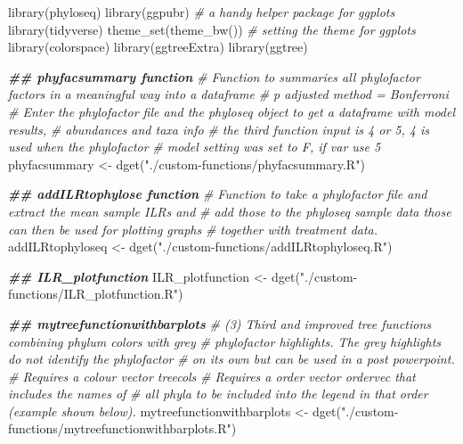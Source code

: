 \documentclass[
]{book}
\newenvironment{Shaded}{\begin{snugshade}}{\end{snugshade}}
\newcommand{\CommentTok}[1]{\textcolor[rgb]{0.56,0.35,0.01}{\textit{#1}}}
\newcommand{\DocumentationTok}[1]{\textcolor[rgb]{0.56,0.35,0.01}{\textbf{\textit{#1}}}}
\newcommand{\FunctionTok}[1]{\textcolor[rgb]{0.00,0.00,0.00}{#1}}
\newcommand{\NormalTok}[1]{#1}
\newcommand{\OtherTok}[1]{\textcolor[rgb]{0.56,0.35,0.01}{#1}}
\newcommand{\StringTok}[1]{\textcolor[rgb]{0.31,0.60,0.02}{#1}}
\begin{document}
\begin{Shaded}
\begin{Highlighting}[]
\FunctionTok{library}\NormalTok{(phyloseq)}
\FunctionTok{library}\NormalTok{(ggpubr)       }\CommentTok{\# a handy helper package for ggplots}
\FunctionTok{library}\NormalTok{(tidyverse)}
\FunctionTok{theme\_set}\NormalTok{(}\FunctionTok{theme\_bw}\NormalTok{())  }\CommentTok{\# setting the theme for ggplots}
\FunctionTok{library}\NormalTok{(colorspace)}
\FunctionTok{library}\NormalTok{(ggtreeExtra)}
\FunctionTok{library}\NormalTok{(ggtree)}
 
\DocumentationTok{\#\# phyfacsummary function }
\CommentTok{\# Function to summaries all phylofactor factors in a meaningful way into a dataframe}
\CommentTok{\# p adjusted method = Bonferroni}
\CommentTok{\# Enter the phylofactor file and the phyloseq object to get a dataframe with model results, }
\CommentTok{\# abundances and taxa info}
\CommentTok{\# the third function input is \textquotesingle{}4\textquotesingle{} or \textquotesingle{}5\textquotesingle{},  4 is used when the phylofactor }
\CommentTok{\# model setting was set to \textquotesingle{}F\textquotesingle{}, if \textquotesingle{}var\textquotesingle{} use 5}
\NormalTok{phyfacsummary }\OtherTok{\textless{}{-}} \FunctionTok{dget}\NormalTok{(}\StringTok{"./custom{-}functions/phyfacsummary.R"}\NormalTok{)}

\DocumentationTok{\#\# addILRtophylose function }
\CommentTok{\# Function to take a phylofactor file and extract the mean sample ILRs and }
\CommentTok{\# add those to the phyloseq sample data those can then be used for plotting graphs }
\CommentTok{\# together with treatment data. }
\NormalTok{addILRtophyloseq }\OtherTok{\textless{}{-}} \FunctionTok{dget}\NormalTok{(}\StringTok{"./custom{-}functions/addILRtophyloseq.R"}\NormalTok{)}

\DocumentationTok{\#\# ILR\_plotfunction}
\NormalTok{ILR\_plotfunction }\OtherTok{\textless{}{-}} \FunctionTok{dget}\NormalTok{(}\StringTok{"./custom{-}functions/ILR\_plotfunction.R"}\NormalTok{)}

\DocumentationTok{\#\# mytreefunctionwithbarplots}
\CommentTok{\# (3) Third and improved tree functions combining phylum colors with grey }
\CommentTok{\# phylofactor highlights. The grey highlights do not identify the phylofactor }
\CommentTok{\# on its own but can be used in a post powerpoint. }
\CommentTok{\# Requires a colour vector \textquotesingle{}treecols\textquotesingle{}}
\CommentTok{\# Requires a order vector \textquotesingle{}ordervec\textquotesingle{} that includes the names of }
\CommentTok{\# all phyla to be included into the legend in that order (example shown below). }
\NormalTok{mytreefunctionwithbarplots }\OtherTok{\textless{}{-}} \FunctionTok{dget}\NormalTok{(}\StringTok{"./custom{-}functions/mytreefunctionwithbarplots.R"}\NormalTok{)}


\end{Highlighting}
\end{Shaded}
\end{document}
